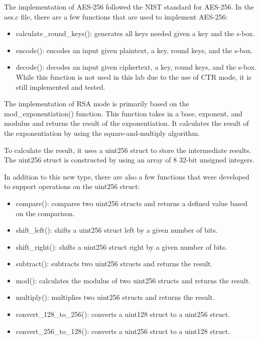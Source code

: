 The implementation of AES-256 followed the NIST standard for AES-256. 
In the aes.c file, there are a few functions that are used to implement AES-256:
\begin{itemize}
    \item calculate\_round\_keys(): generates all keys needed given a key and the s-box.
    \item encode(): encodes an input given plaintext, a key, round keys, and the s-box.
    \item decode(): decodes an input given ciphertext, a key, round keys, and the s-box. While this function is not used in this lab due to the use of CTR mode, it is still implemented and tested.
\end{itemize}

The implementation of RSA mode is primarily based on the mod\_exponentiation() function. 
This function takes in a base, exponent, and modulus and returns the result of the exponentiation. 
It calculates the result of the exponentiation by using the square-and-multiply algorithm.

To calculate the result, it uses a uint256 struct to store the intermediate results. 
The uint256 struct is constructed by using an array of 8 32-bit unsigned integers.

In addition to this new type, there are also a few functions that were developed to
support operations on the uint256 struct:
\begin{itemize}
    \item compare(): compares two uint256 structs and returns a defined value based on the comparison.
    \item shift\_left(): shifts a uint256 struct left by a given number of bits.
    \item shift\_right(): shifts a uint256 struct right by a given number of bits.
    \item subtract(): subtracts two uint256 structs and returns the result.
    \item mod(): calculates the modulus of two uint256 structs and returns the result.
    \item multiply(): multiplies two uint256 structs and returns the result.
    \item convert\_128\_to\_256(): converts a uint128 struct to a uint256 struct.
    \item convert\_256\_to\_128(): converts a uint256 struct to a uint128 struct.
\end{itemize}
